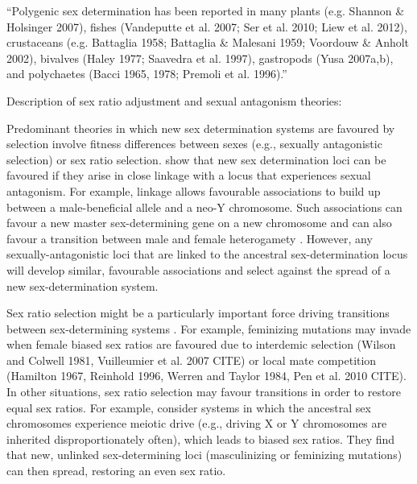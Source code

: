 \documentclass[12pt]{article}
\begin{document}
``Polygenic sex determination has been reported in many plants (e.g. Shannon \& Holsinger 2007), fishes (Vandeputte et al. 2007; Ser et al. 2010; Liew et al. 2012), crustaceans (e.g. Battaglia 1958; Battaglia \& Malesani 1959; Voordouw
\& Anholt 2002), bivalves (Haley 1977; Saavedra et al. 1997), gastropods (Yusa 2007a,b), and polychaetes (Bacci 1965, 1978; Premoli et al. 1996).''


\noindent
Description of sex ratio adjustment and sexual antagonism theories:

Predominant theories in which new sex determination systems are favoured by selection involve fitness differences between sexes (e.g., sexually antagonistic selection) or sex ratio selection.
\citet{vanDoorn:2007eu,vanDoorn:2010hu} show that new sex determination loci can be favoured if they arise in close linkage with a locus that experiences sexual antagonism. 
For example, linkage allows favourable associations to build up between a male-beneficial allele and a neo-Y chromosome. 
Such associations can favour a new master sex-determining gene on a new chromosome \citep{vanDoorn:2007eu} and can also favour a transition between male and female heterogamety \citep[e.g., a ZW to XY transition,][]{vanDoorn:2010hu}.
However, any sexually-antagonistic loci that are linked to the ancestral sex-determination locus will develop similar, favourable associations and select against the spread of a new sex-determination system. 

Sex ratio selection might be a particularly important force driving transitions between sex-determining systems \citep[Chapter 7]{Beukeboom:2014vb}. 
For example, feminizing mutations may invade when female biased sex ratios are favoured due to interdemic selection (Wilson and Colwell 1981, Vuilleumier et al. 2007 CITE) or local mate competition (Hamilton 1967, Reinhold 1996, Werren and Taylor 1984, Pen et al. 2010 CITE). 
In other situations, sex ratio selection may favour transitions in order to restore equal sex ratios. 
For example, \citet{Kozielska:2010vm} consider systems in which the ancestral sex chromosomes experience meiotic drive (e.g., driving X or Y chromosomes are inherited disproportionately often), which leads to biased sex ratios. They find that new, unlinked sex-determining loci (masculinizing or feminizing mutations) can then spread, restoring an even sex ratio. 
\end{document}
